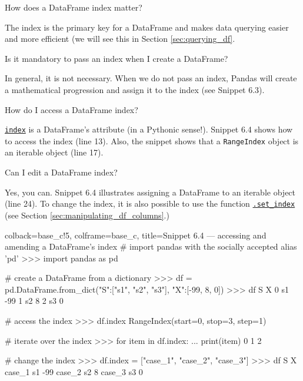 \documentclass[a4paper,11pt]{book}
\newcommand{\question}[1]{%
    \begin{tcolorbox}[colback=comp_c!10,colframe=comp_c,sidebyside align=top,width=\linewidth,before skip=1ex]
        #1
    \end{tcolorbox}
    \switchcolumn%
}
\newcommand{\note}[1]{%
    \begin{tcolorbox}[colback=white!0,colframe=white!10,width=\linewidth,before skip=1ex]
        #1
    \end{tcolorbox}
}
\begin{document}
\begin{paracol}{2}
	\question{\raggedright How does a DataFrame index matter?}
	\note{The index is the primary key for a DataFrame and makes data querying easier and more efficient (we will see this in Section \ref{sec:querying_df}.}
\end{paracol}
\clearpage

\begin{paracol}{2}
	\question{\raggedright Is it mandatory to pass an index when I create a DataFrame?}
	\note{In general, it is not necessary. When we do not pass an index, Pandas will create a mathematical progression and assign it to the index (see Snippet 6.3).}
\end{paracol}

\begin{paracol}{2}
	\question{\raggedright How do I access a DataFrame index?}
	\note{\href{https://pandas.pydata.org/docs/reference/api/pandas.DataFrame.index.html}{\texttt{index}} is a DataFrame's attribute (in a Pythonic sense!). Snippet 6.4 shows how to access the index (line 13). Also, the snippet shows that a \texttt{RangeIndex} object is an iterable object (line 17).}
\end{paracol}

\begin{paracol}{2}
	\question{\raggedright Can I edit a DataFrame index?}
	\note{Yes, you can. Snippet 6.4 illustrates assigning a DataFrame to an iterable object (line 24). To change the index, it is also possible to use the function \href{https://pandas.pydata.org/docs/reference/api/pandas.DataFrame.set_index.html}{\texttt{.set\_index}} (see Section \ref{sec:manipulating_df_columns}.)}
\end{paracol}

\begin{pythoncode}[linenos=True]{colback=base_c!5, colframe=base_c, title=\sffamily Snippet 6.4 --- accessing and amending a DataFrame's index}
# import pandas with the socially accepted alias 'pd'
>>> import pandas as pd

# create a DataFrame from a dictionary
>>> df = pd.DataFrame.from_dict({"S":["s1", "s2", "s3"], "X":[-99, 8, 0]})
>>> df
    S   X
0  s1 -99
1  s2   8
2  s3   0

# access the index 
>>> df.index
RangeIndex(start=0, stop=3, step=1)

# iterate over the index
>>> for item in df.index:
...     print(item)
0
1
2

# change the index
>>> df.index = ["case_1", "case_2", "case_3"]
>>> df
         S   X
case_1  s1 -99
case_2  s2   8
case_3  s3   0

\end{pythoncode}
\clearpage
\end{document}
